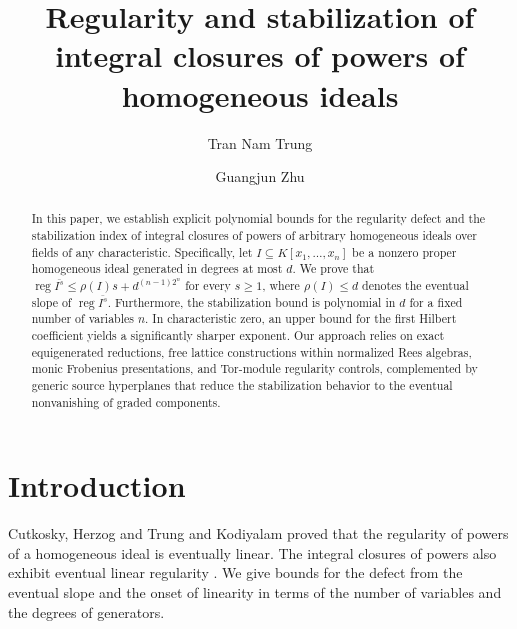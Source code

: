 \documentclass[12pt]{amsart}
\numberwithin{equation}{section}
\theoremstyle{definition}
\theoremstyle{remark}
\numberwithin{equation}{section}
\DeclareMathOperator{\reg}{reg}
\begin{document}

\title{Regularity and stabilization of integral closures of powers of homogeneous ideals}

\author{Tran Nam Trung}
\address{Institute for artificial Intelligence, Vnu University of Engineering and Technology, Hanoi, Vietnam}

\author{Guangjun Zhu}
\address{School of Mathematical Sciences, Soochow University, Suzhou, Jiangsu, 215006, P. R.~China}



\begin{abstract}
In this paper, we establish explicit polynomial bounds for the regularity defect and the stabilization index of integral closures of powers of arbitrary homogeneous ideals over fields of any characteristic. Specifically, let $I \subseteq K[x_{1}, \dots, x_{n}]$ be a nonzero proper homogeneous ideal generated in degrees at most $d$. We prove that $\reg \overline{I^{s}} \le \rho(I)s + d^{(n-1)2^{n}}$ for every $s \ge 1$, where $\rho(I) \le d$ denotes the eventual slope of $\reg \overline{I^{s}}$. Furthermore, the stabilization bound is polynomial in $d$ for a fixed number of variables $n$. In characteristic zero, an upper bound for the first Hilbert coefficient yields a significantly sharper exponent. Our approach relies on exact equigenerated reductions, free lattice constructions within normalized Rees algebras, monic Frobenius presentations, and Tor-module regularity controls, complemented by generic source hyperplanes that reduce the stabilization behavior to the eventual nonvanishing of graded components.
\end{abstract}

\maketitle


\section{Introduction}
Cutkosky, Herzog and Trung \cite{CHT} and Kodiyalam \cite{Kod} proved that the regularity of powers of a homogeneous ideal is
eventually linear. The integral closures of powers also exhibit eventual linear regularity \cite{CHT,TW}. We give bounds for the defect
from the eventual slope and the onset of linearity in terms of the number of variables and the degrees of generators.
\end{document}
